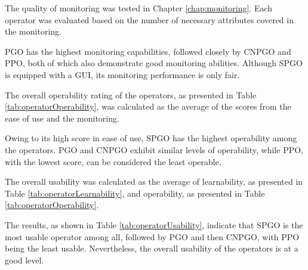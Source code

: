 The quality of monitoring was tested in Chapter \ref{chap:monitoring}. Each operator was evaluated based on the number of necessary attributes covered in the monitoring.

PGO has the highest monitoring capabilities, followed closely by CNPGO and PPO, both of which also demonstrate good monitoring abilities. Although SPGO is equipped with a GUI, its monitoring performance is only fair.



The overall operability rating of the operators, as presented in Table \ref{tab:operatorOperability}, was calculated as the average of the scores from the ease of use and the monitoring.

Owing to its high score in ease of use, SPGO has the highest operability among the operators. PGO and CNPGO exhibit similar levels of operability, while PPO, with the lowest score, can be considered the least operable.


The overall usability was calculated as the average of learnability, as presented in Table \ref{tab:operatorLearnability}, and operability, as presented in Table \ref{tab:operatorOperability}.

The results, as shown in Table \ref{tab:operatorUsability}, indicate that SPGO is the most usable operator among all, followed by PGO and then CNPGO, with PPO being the least usable.
Nevertheless, the overall usability of the operators is at a good level.



